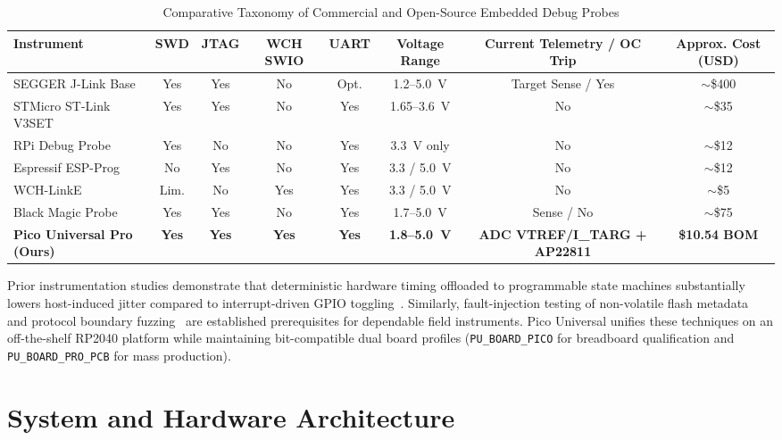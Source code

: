 \documentclass[journal]{IEEEtran}
\begin{document}
\begin{table}[t]
\centering
\caption{Comparative Taxonomy of Commercial and Open-Source Embedded Debug Probes}
\label{tab:taxonomy}
\begin{tabular}{@{}lccccccc@{}}
\toprule
\textbf{Instrument} & \textbf{SWD} & \textbf{JTAG} & \textbf{WCH SWIO} & \textbf{UART} & \textbf{Voltage Range} & \textbf{Current Telemetry / OC Trip} & \textbf{Approx. Cost (USD)} \\
\midrule
SEGGER J-Link Base~\cite{segger_jlink} & Yes & Yes & No & Opt. & 1.2--5.0~V & Target Sense / Yes & $\sim$\$400 \\
STMicro ST-Link V3SET~\cite{st_stlink_v3} & Yes & Yes & No & Yes & 1.65--3.6~V & No & $\sim$\$35 \\
RPi Debug Probe~\cite{rpi_debugprobe} & Yes & No & No & Yes & 3.3~V only & No & $\sim$\$12 \\
Espressif ESP-Prog~\cite{espressif_espprog} & No & Yes & No & Yes & 3.3 / 5.0~V & No & $\sim$\$12 \\
WCH-LinkE~\cite{wch_linke} & Lim. & No & Yes & Yes & 3.3 / 5.0~V & No & $\sim$\$5 \\
Black Magic Probe~\cite{blackmagic_probe} & Yes & Yes & No & Yes & 1.7--5.0~V & Sense / No & $\sim$\$75 \\
\textbf{Pico Universal Pro (Ours)} & \textbf{Yes} & \textbf{Yes} & \textbf{Yes} & \textbf{Yes} & \textbf{1.8--5.0~V} & \textbf{ADC VTREF/I\_TARG + AP22811} & \textbf{\$10.54 BOM} \\
\bottomrule
\end{tabular}
\end{table}

Prior instrumentation studies demonstrate that deterministic hardware timing offloaded to programmable state machines substantially lowers host-induced jitter compared to interrupt-driven GPIO toggling~\cite{ieee_tim_embedded_inst,ieee_tim_usb_daq}. Similarly, fault-injection testing of non-volatile flash metadata~\cite{powercut_flash_journal} and protocol boundary fuzzing~\cite{fuzzing_usb_protocols} are established prerequisites for dependable field instruments. Pico Universal unifies these techniques on an off-the-shelf RP2040 platform while maintaining bit-compatible dual board profiles (\texttt{PU\_BOARD\_PICO} for breadboard qualification and \texttt{PU\_BOARD\_PRO\_PCB} for mass production).

\section{System and Hardware Architecture}
\label{sec:hardware}
\end{document}
